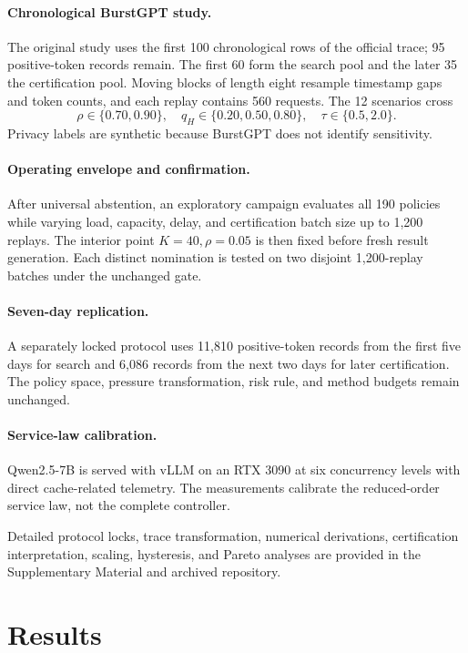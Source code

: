 \documentclass[futureinternet,article,submit,moreauthors]{Definitions/mdpi}
\begin{document}
\paragraph{Chronological BurstGPT study.}
The original study uses the first 100 chronological rows of the official trace; 95 positive-token records remain. The first 60 form the search pool and the later 35 the certification pool. Moving blocks of length eight resample timestamp gaps and token counts, and each replay contains 560 requests. The 12 scenarios cross
\[
\rho\in\{0.70,0.90\},\quad
q_H\in\{0.20,0.50,0.80\},\quad
\tau\in\{0.5,2.0\}.
\]
Privacy labels are synthetic because BurstGPT does not identify sensitivity.

\paragraph{Operating envelope and confirmation.}
After universal abstention, an exploratory campaign evaluates all 190 policies while varying load, capacity, delay, and certification batch size up to 1,200 replays. The interior point $K=40,\rho=0.05$ is then fixed before fresh result generation. Each distinct nomination is tested on two disjoint 1,200-replay batches under the unchanged gate.

\paragraph{Seven-day replication.}
A separately locked protocol uses 11,810 positive-token records from the first five days for search and 6,086 records from the next two days for later certification. The policy space, pressure transformation, risk rule, and method budgets remain unchanged.

\paragraph{Service-law calibration.}
Qwen2.5-7B is served with vLLM on an RTX 3090 at six concurrency levels with direct cache-related telemetry. The measurements calibrate the reduced-order service law, not the complete controller.

Detailed protocol locks, trace transformation, numerical derivations, certification interpretation, scaling, hysteresis, and Pareto analyses are provided in the Supplementary Material and archived repository.

\section{Results}
\label{sec:results}
\end{document}
